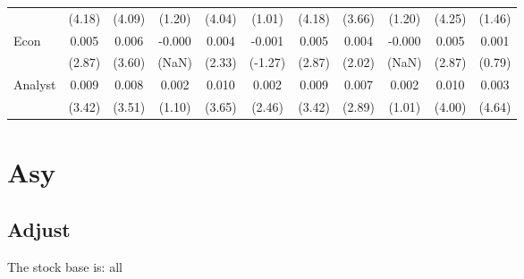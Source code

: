 \documentclass[
]{article}
\begin{document}
\begin{table}[H]
{\begin{tabular}{lcccccccccc}
   & (4.18) & (4.09) & (1.20) & (4.04) & (1.01) & (4.18) & (3.66) & (1.20) & (4.25) & (1.46) \\ 
  Econ & 0.005 & 0.006 & -0.000 & 0.004 & -0.001 & 0.005 & 0.004 & -0.000 & 0.005 & 0.001 \\ 
   & (2.87) & (3.60) & (NaN) & (2.33) & (-1.27) & (2.87) & (2.02) & (NaN) & (2.87) & (0.79) \\ 
  Analyst & 0.009 & 0.008 & 0.002 & 0.010 & 0.002 & 0.009 & 0.007 & 0.002 & 0.010 & 0.003 \\ 
   & (3.42) & (3.51) & (1.10) & (3.65) & (2.46) & (3.42) & (2.89) & (1.01) & (4.00) & (4.64) \\ 
   \hline 
\end{tabular}
}
\end{table}
\newpage
\section{Asy}
\subsection{Adjust}

The stock base is: all
\end{document}
